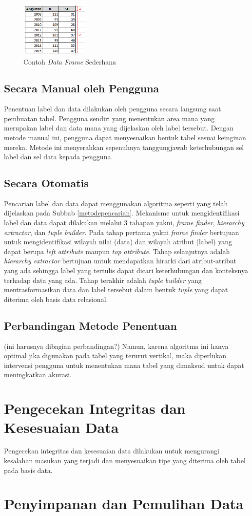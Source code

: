 \begin{figure}[htb]
    \centering
    \includegraphics[width=0.3\textwidth]{resources/chapter-3-simple-dataframe.png}
    \caption{Contoh \textit{Data Frame} Sederhana}
	\label{DataFrameSederhana}
\end{figure}

	\subsection{Secara Manual oleh Pengguna}
	Penentuan label dan data dilakukan oleh pengguna secara langsung saat pembuatan tabel. Pengguna sendiri yang menentukan area mana yang merupakan label dan data mana yang dijelaskan oleh label tersebut. Dengan metode manual ini, pengguna dapat menyesuaikan bentuk tabel sesuai keinginan mereka. Metode ini menyerahkan sepenuhnya tanggungjawab keterhubungan sel label dan sel data kepada pengguna.

	\subsection{Secara Otomatis}
	Pencarian label dan data dapat menggunakan algoritma seperti yang telah dijelaskan pada Subbab \ref{metodepencarian}. Mekanisme untuk mengidentifikasi label dan data dapat dilakukan melalui 3 tahapan yakni, \textit{frame finder}, \textit{hierarchy extractor}, dan \textit{tuple builder}. Pada tahap pertama yakni \textit{frame finder} bertujuan untuk mengidentifikasi wilayah nilai (data) dan wilayah atribut (label) yang dapat berupa \textit{left attribute} maupun \textit{top attribute}. Tahap selanjutnya adalah \textit{hierarchy extractor} bertujuan untuk mendapatkan hirarki dari atribut-atribut yang ada sehingga label yang tertulis dapat dicari keterhubungan dan konteksnya terhadap data yang ada. Tahap terakhir adalah \textit{tuple builder} yang mentrasformasikan data dan label tersebut dalam bentuk \textit{tuple} yang dapat diterima oleh basis data relasional.

	\subsection{Perbandingan Metode Penentuan}
    (ini harusnya dibagian perbandingan?)
	Namun, karena algoritma ini hanya optimal jika digunakan pada tabel yang terurut vertikal, maka diperlukan intervensi pengguna untuk menentukan mana tabel yang dimaksud untuk dapat meningkatkan akurasi.

\section{Pengecekan Integritas dan Kesesuaian Data}
Pengecekan integritas dan kesesuaian data dilakukan untuk mengurangi kesalahan masukan yang terjadi dan menyesuaikan tipe yang diterima oleh tabel pada basis data. 

\section{Penyimpanan dan Pemulihan Data}

